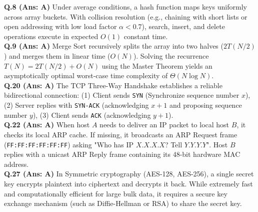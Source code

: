 \begin{solutionbox}
\textbf{Q.8 (Ans: A)} Under average conditions, a hash function maps keys uniformly across array buckets. With collision resolution (e.g., chaining with short lists or open addressing with low load factor $\alpha < 0.7$), search, insert, and delete operations execute in expected $O(1)$ constant time.\\[2mm]
\textbf{Q.9 (Ans: A)} Merge Sort recursively splits the array into two halves ($2T(N/2)$) and merges them in linear time ($O(N)$). Solving the recurrence $T(N) = 2T(N/2) + O(N)$ using the Master Theorem yields an asymptotically optimal worst-case time complexity of $\Theta(N \log N)$.\\[2mm]
\textbf{Q.20 (Ans: A)} The TCP Three-Way Handshake establishes a reliable bidirectional connection: (1) Client sends \texttt{SYN} (Synchronize sequence number $x$), (2) Server replies with \texttt{SYN-ACK} (acknowledging $x+1$ and proposing sequence number $y$), (3) Client sends \texttt{ACK} (acknowledging $y+1$).\\[2mm]
\textbf{Q.22 (Ans: A)} When host $A$ needs to deliver an IP packet to local host $B$, it checks its local ARP cache. If missing, it broadcasts an ARP Request frame (\texttt{FF:FF:FF:FF:FF:FF}) asking "Who has IP $X.X.X.X$? Tell $Y.Y.Y.Y$". Host $B$ replies with a unicast ARP Reply frame containing its 48-bit hardware MAC address.\\[2mm]
\textbf{Q.27 (Ans: A)} In Symmetric cryptography (AES-128, AES-256), a single secret key encrypts plaintext into ciphertext and decrypts it back. While extremely fast and computationally efficient for large bulk data, it requires a secure key exchange mechanism (such as Diffie-Hellman or RSA) to share the secret key.
\end{solutionbox}

\newpage
